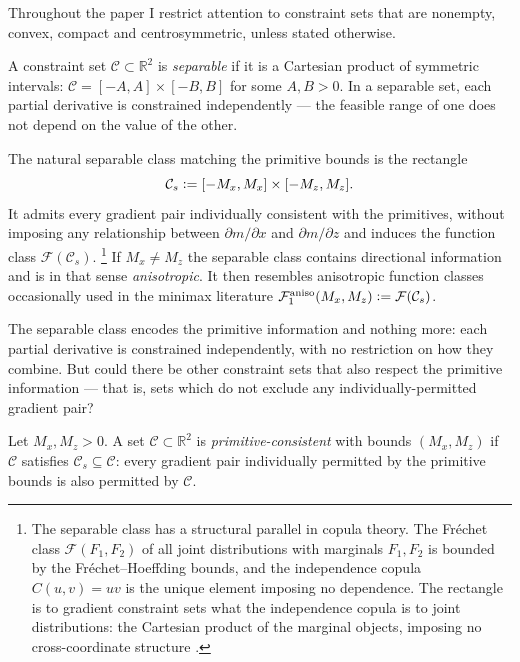 Throughout the paper I restrict attention to constraint sets that are nonempty, convex, compact and centrosymmetric, unless stated otherwise.

\begin{definition}\label{def:separable}
	A constraint set $\mathcal{C} \subset \mathbb{R}^2$ is \emph{separable} if it is a Cartesian product of symmetric intervals: $\mathcal{C} = [-A, A] \times [-B, B]$ for some $A, B > 0$.
	In a separable set, each partial derivative is constrained independently --- the feasible range of one does not depend on the value of the other.
\end{definition}

The natural separable class matching the primitive bounds is the rectangle
\begin{equation*}
	\mathcal{C}_s \vcentcolon= [-M_x, M_x] \times [-M_z, M_z].
\end{equation*}
It admits every gradient pair individually consistent with the primitives, without imposing any relationship between $\partial m / \partial x$ and $\partial m / \partial z$ and induces the function class $\mathcal{F}(\mathcal{C}_s)$.
\footnote{The separable class has a structural parallel in copula theory. The Fréchet class $\mathcal{F}(F_1, F_2)$ of all joint distributions with marginals $F_1, F_2$ is bounded by the Fréchet--Hoeffding bounds, and the independence copula $C(u,v) = uv$ is the unique element imposing no dependence. The rectangle is to gradient constraint sets what the independence copula is to joint distributions: the Cartesian product of the marginal objects, imposing no cross-coordinate structure \parencite[cf.][Chapter~2]{nelsen_introduction_2006}.} If $M_x \neq M_z$ the separable class contains directional information and is in that sense \textit{anisotropic}. It then resembles anisotropic function classes occasionally used in the minimax literature $\mathcal{F}_1^{\mathrm{aniso}}(M_x, M_z) \vcentcolon= \mathcal{F}(\mathcal{C}_s)$.

The separable class encodes the primitive information and nothing more: each partial derivative is constrained independently, with no restriction on how they combine.
But could there be other constraint sets that also respect the primitive information --- that is, sets which do not exclude any individually-permitted gradient pair?

\begin{definition}\label{def:primitive_consistent}
	Let $M_x, M_z > 0$.
	A set $\mathcal{C} \subset \mathbb{R}^2$ is \emph{primitive-consistent} with bounds $(M_x, M_z)$ if $\mathcal{C}$ satisfies $\mathcal{C}_s \subseteq \mathcal{C}$: every gradient pair individually permitted by the primitive bounds is also permitted by $\mathcal{C}$.
\end{definition}

